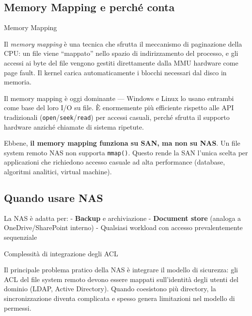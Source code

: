 \documentclass[
  italian,
  openany]{book}
\begin{document}
\subsection{Memory Mapping e perché
conta}\label{memory-mapping-e-perchuxe9-conta}

\begin{calloutdefinition}{Memory Mapping}

Il \emph{memory mapping} è una tecnica che sfrutta il meccanismo di
paginazione della CPU: un file viene ``mappato'' nello spazio di
indirizzamento del processo, e gli accessi ai byte del file vengono
gestiti direttamente dalla MMU hardware come page fault. Il kernel
carica automaticamente i blocchi necessari dal disco in memoria.

\end{calloutdefinition}

Il memory mapping è oggi dominante --- Windows e Linux lo usano entrambi
come base del loro I/O su file. È enormemente più efficiente rispetto
alle API tradizionali (\texttt{open}/\texttt{seek}/\texttt{read}) per
accessi casuali, perché sfrutta il supporto hardware anziché chiamate di
sistema ripetute.

Ebbene, \textbf{il memory mapping funziona su SAN, ma non su NAS}. Un
file system remoto NAS non supporta \texttt{mmap()}. Questo rende la SAN
l'unica scelta per applicazioni che richiedono accesso casuale ad alta
performance (database, algoritmi analitici, virtual machine).

\subsection{Quando usare NAS}\label{quando-usare-nas}

La NAS è adatta per: - \textbf{Backup} e archiviazione -
\textbf{Document store} (analoga a OneDrive/SharePoint interno) -
Qualsiasi workload con accesso prevalentemente sequenziale

\begin{calloutwarning}{Complessità di integrazione degli ACL}

Il principale problema pratico della NAS è integrare il modello di
sicurezza: gli ACL del file system remoto devono essere mappati
sull'identità degli utenti del dominio (LDAP, Active Directory). Quando
coesistono più directory, la sincronizzazione diventa complicata e
spesso genera limitazioni nel modello di permessi.

\end{calloutwarning}
\end{document}
